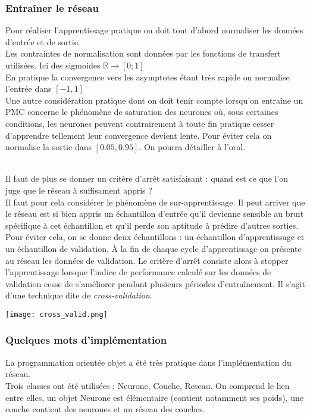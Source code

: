 \documentclass[a4paper, 11pt]{article}
\begin{document}
	\subsubsection{Entraîner le réseau}
	Pour réaliser l'apprentissage pratique on doit tout d'abord normaliser les données d'entrée et de sortie.
	\\Les contraintes de normalisation sont données par les fonctions de transfert utilisées. Ici des sigmoides $\mathbb{R} \to [0;1]$
	\\En pratique la convergence vers les asymptotes étant très rapide on normalise l'entrée dans $[-1,1]$
	\\Une autre considération pratique dont on doit tenir compte lorsqu’on entraîne un PMC concerne le phénomène de saturation des neurones où, sous certaines conditions, les neurones peuvent contrairement à toute fin pratique cesser d’apprendre tellement leur convergence devient lente. Pour éviter cela on normalise la sortie dans $[0.05, 0.95]$. On pourra détailler à l'oral.
	
	\\Il faut de plus se donner un critère d'arrêt satisfaisant : quand est ce que l'on juge que le réseau à suffisament appris ?
	\\Il faut pour cela considérer le phénomène de sur-apprentissage. Il peut arriver que le réseau est si bien appris un échantillon d'entrée qu'il devienne sensible au bruit spécifique
	à cet échantillon et qu'il perde son aptitude à prédire d'autres sorties.
	\\Pour éviter cela, on se donne deux échantillons : un échantillon d'apprentissage et un échantillon de validation. À la fin de chaque cycle d'apprentissage on présente au réseau les données de validation. Le critère d’arrêt consiste alors à stopper l’apprentissage lorsque l’indice de performance calculé sur les données de validation cesse de s’améliorer pendant plusieurs périodes d’entraînement. Il s'agit d'une technique dite de \emph{cross-validation}.
	
	\texttt{[image: cross\_valid.png]}
	
	\subsubsection{Quelques mots d'implémentation}
	
	La programmation orientée objet a été très pratique dans l'implémentation du réseau.
	\\Trois classes ont été utilisées : Neurone, Couche, Reseau. On comprend le lien entre elles, un objet Neurone est élémentaire (contient notamment ses poids), une couche contient des neurones et un réseau des couches.
	
\end{document}
